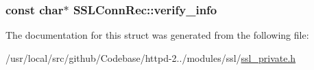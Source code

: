 \subsubsection[{\texorpdfstring{verify\+\_\+info}{verify_info}}]{\setlength{\rightskip}{0pt plus 5cm}const char$\ast$ S\+S\+L\+Conn\+Rec\+::verify\+\_\+info}\hypertarget{structSSLConnRec_a222765269058c8c8fa00113cdaf88b22}{}\label{structSSLConnRec_a222765269058c8c8fa00113cdaf88b22}


The documentation for this struct was generated from the following file\+:\begin{DoxyCompactItemize}
\item 
/usr/local/src/github/\+Codebase/httpd-\/2../modules/ssl/\hyperlink{ssl__private_8h}{ssl\+\_\+private.\+h}\end{DoxyCompactItemize}
